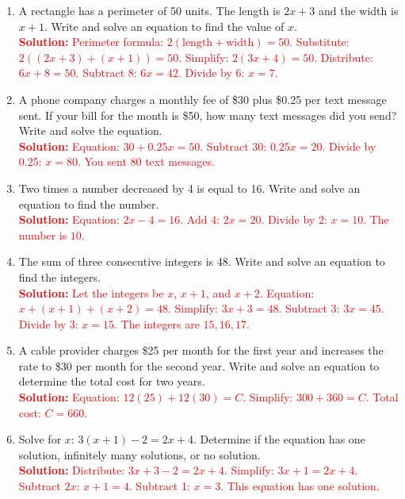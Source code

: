 \documentclass[11pt]{article}
\begin{document}
\begin{tcolorbox}[colframe=black!60, colback=white, 
coltitle=black, colbacktitle=black!15, fonttitle=\bfseries\Large, 
title=Problems, halign title=center, left=10pt, right=10pt, top=10pt, bottom=60pt]
\begin{enumerate}[start=9, itemsep=3em]
    \item A rectangle has a perimeter of 50 units. The length is \(2x + 3\) and the width is \(x + 1\). Write and solve an equation to find the value of \(x\).\\
    \textcolor{red}{\textbf{Solution:} Perimeter formula: \(2(\text{length} + \text{width}) = 50\). Substitute: \(2((2x+3) + (x+1)) = 50\). Simplify: \(2(3x+4) = 50\). Distribute: \(6x + 8 = 50\). Subtract 8: \(6x = 42\). Divide by 6: \(x = 7\).}

    \item A phone company charges a monthly fee of \$30 plus \$0.25 per text message sent. If your bill for the month is \$50, how many text messages did you send? Write and solve the equation.\\
    \textcolor{red}{\textbf{Solution:} Equation: \(30 + 0.25x = 50\). Subtract 30: \(0.25x = 20\). Divide by 0.25: \(x = 80\). You sent 80 text messages.}

    \item Two times a number decreased by 4 is equal to 16. Write and solve an equation to find the number.\\
    \textcolor{red}{\textbf{Solution:} Equation: \(2x - 4 = 16\). Add 4: \(2x = 20\). Divide by 2: \(x = 10\). The number is \(10\).}

    \item The sum of three consecutive integers is 48. Write and solve an equation to find the integers.\\
    \textcolor{red}{\textbf{Solution:} Let the integers be \(x\), \(x+1\), and \(x+2\). Equation: \(x + (x+1) + (x+2) = 48\). Simplify: \(3x + 3 = 48\). Subtract 3: \(3x = 45\). Divide by 3: \(x = 15\). The integers are \(15, 16, 17\).}

    \item A cable provider charges \$25 per month for the first year and increases the rate to \$30 per month for the second year. Write and solve an equation to determine the total cost for two years.\\
    \textcolor{red}{\textbf{Solution:} Equation: \(12(25) + 12(30) = C\). Simplify: \(300 + 360 = C\). Total cost: \(C = 660\).}

    \item Solve for \(x\): \(3(x + 1) - 2 = 2x + 4\). Determine if the equation has one solution, infinitely many solutions, or no solution.\\
    \textcolor{red}{\textbf{Solution:} Distribute: \(3x + 3 - 2 = 2x + 4\). Simplify: \(3x + 1 = 2x + 4\). Subtract \(2x\): \(x + 1 = 4\). Subtract 1: \(x = 3\). This equation has one solution.}
\end{enumerate}
\end{tcolorbox}
\end{document}
